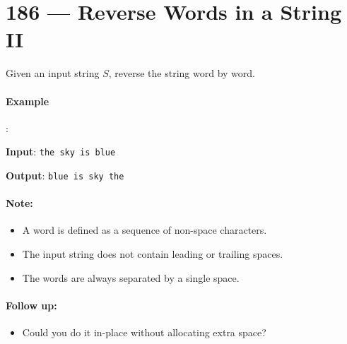 \section{186 --- Reverse Words in a String II}
Given an input string $S$, reverse the string word by word. 
\par
\paragraph{Example}:
\begin{flushleft}
\textbf{Input}: \texttt{the sky is blue}
\par
\textbf{Output}: \texttt{blue is sky the}
\end{flushleft}
\paragraph{Note: }

\begin{itemize}
\item A word is defined as a sequence of non-space characters.
\item The input string does not contain leading or trailing spaces.
\item The words are always separated by a single space.
\end{itemize}
\paragraph{Follow up:} 
\begin{itemize}
\item Could you do it in-place without allocating extra space?
\end{itemize}